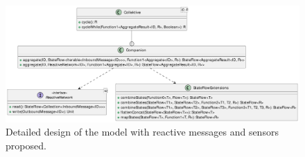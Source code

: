\begin{figure}
    \centering
    \includegraphics[width=\linewidth]{figures/collektive-rmsm-design.pdf}
    \caption{Detailed design of the model with reactive messages and sensors proposed.}
    \label{fig:collektive-rmsm-design}
\end{figure}
